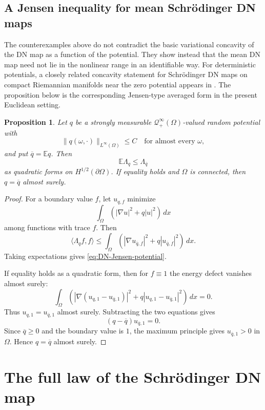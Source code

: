 \documentclass[11pt]{article}
\newcommand{\OmegaD}{\Omega}
\newcommand{\E}{\mathbb E}
\newcommand{\la}{\langle}
\newcommand{\ra}{\rangle}
\theoremstyle{plain}
\newtheorem{proposition}[theorem]{Proposition}
\theoremstyle{definition}
\theoremstyle{remark}
\begin{document}
\subsection{A Jensen inequality for mean Schr\"odinger DN maps}
\label{sec:DN-Jensen-potential}

The counterexamples above do not contradict the basic variational concavity of the DN map as a function of the potential.  They show instead that the mean DN map need not lie in the nonlinear range in an identifiable way.  For deterministic potentials, a closely related concavity statement for Schr\"odinger DN maps on compact Riemannian manifolds near the zero potential appears in \cite{CarsteaFeizmohammadiOksanen2023}.  The proposition below is the corresponding Jensen-type averaged form in the present Euclidean setting.

\begin{proposition}\label{prop:DN-Jensen-potential}
Let $q$ be a strongly measurable $\mathcal Q_+^\infty(\OmegaD)$-valued random potential with
\[
  \|q(\omega,\cdot)\|_{L^\infty(\OmegaD)}\le C
  \quad\text{for almost every }\omega,
\]
and put $\overline q=\E q$.  Then
\begin{equation}\label{eq:DN-Jensen-potential}
  \E\Lambda_q\le \Lambda_{\overline q}
\end{equation}
as quadratic forms on $H^{1/2}(\partial\OmegaD)$.  If equality holds and $\OmegaD$ is connected, then $q=\overline q$ almost surely.
\end{proposition}

\begin{proof}
For a boundary value $f$, let $u_{q,f}$ minimize
\[
  \int_\OmegaD (|\nabla u|^2+q|u|^2)\,dx
\]
among functions with trace $f$.  Then
\[
  \la\Lambda_qf,f\ra
  \le \int_\OmegaD (|\nabla u_{\overline q,f}|^2+q|u_{\overline q,f}|^2)\,dx.
\]
Taking expectations gives \eqref{eq:DN-Jensen-potential}.

If equality holds as a quadratic form, then for $f\equiv1$ the energy defect vanishes almost surely:
\[
  \int_\OmegaD (|\nabla(u_{q,1}-u_{\overline q,1})|^2
  +q|u_{q,1}-u_{\overline q,1}|^2)\,dx=0.
\]
Thus $u_{q,1}=u_{\overline q,1}$ almost surely.  Subtracting the two equations gives
\[
  (q-\overline q)u_{\overline q,1}=0.
\]
Since $\overline q\ge0$ and the boundary value is $1$, the maximum principle gives $u_{\overline q,1}>0$ in $\OmegaD$.  Hence $q=\overline q$ almost surely.
\end{proof}

\section{The full law of the Schr\"odinger DN map}
\label{sec:law-DN-map}
\end{document}
